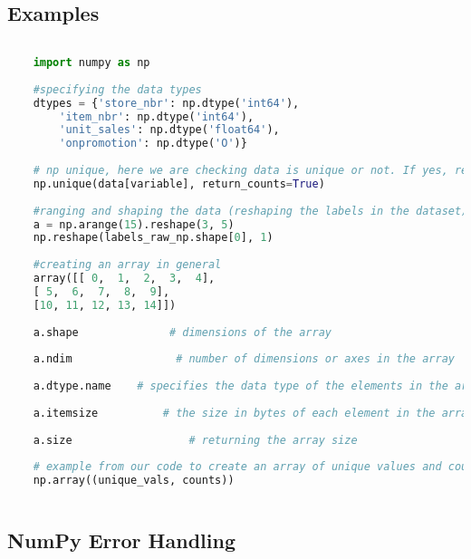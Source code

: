 	\subsection{Examples}
	
		\begin{lstlisting}[language=Python]
			
	import numpy as np
	
	#specifying the data types
	dtypes = {'store_nbr': np.dtype('int64'),
		'item_nbr': np.dtype('int64'),
		'unit_sales': np.dtype('float64'),
		'onpromotion': np.dtype('O')}
	
	# np unique, here we are checking data is unique or not. If yes, returing true
	np.unique(data[variable], return_counts=True)
	
	#ranging and shaping the data (reshaping the labels in the dataset)
	a = np.arange(15).reshape(3, 5)
	np.reshape(labels_raw_np.shape[0], 1)
	
	#creating an array in general 
	array([[ 0,  1,  2,  3,  4],
	[ 5,  6,  7,  8,  9],
	[10, 11, 12, 13, 14]])
	
	a.shape				 # dimensions of the array
	
	a.ndim				  # number of dimensions or axes in the array
	
	a.dtype.name	# specifies the data type of the elements in the array
	
	a.itemsize			# the size in bytes of each element in the array
	
	a.size					# returning the array size 
	
	# example from our code to create an array of unique values and counts
	np.array((unique_vals, counts))
			
		\end{lstlisting}
	
	\subsection{NumPy Error Handling}
	
